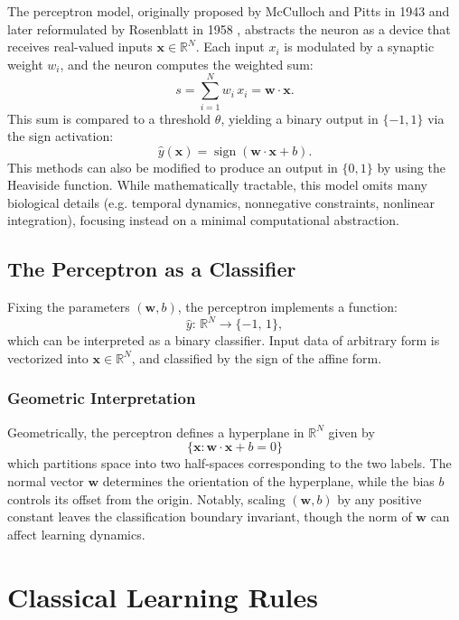 \documentclass[a4paper,12pt]{report}
\begin{document}
The perceptron model, originally proposed by McCulloch and Pitts in 1943 \cite{McCulloch1943} and later 
reformulated by Rosenblatt in 1958 \cite{Rosenblatt1958}, abstracts the neuron as a device that receives 
real-valued inputs $\mathbf{x}\in\mathbb R^N$. Each input $x_i$ is modulated by a synaptic weight 
$w_i$, and the neuron computes the weighted sum:
\[
  s = \sum_{i=1}^N w_i\,x_i = \mathbf{w}\cdot\mathbf{x}.
\]
This sum is compared to a threshold $\theta$, yielding a binary output in $\{-1,1\}$ via the sign activation:
\[
  \hat y(\mathbf{x}) = \operatorname{sign}(\mathbf{w}\cdot\mathbf{x} + b).
\]
This methods can also be modified to produce an output in $\{0, 1\}$ by using the Heaviside function.
While mathematically tractable, this model omits many biological details (e.g. temporal dynamics, 
nonnegative constraints, nonlinear integration), focusing instead on a minimal computational abstraction.

\subsection*{The Perceptron as a Classifier}
Fixing the parameters $(\mathbf{w},b)$, the perceptron implements a function:
\[
  \hat y:\,\mathbb R^N \to \{ -1,\,1 \},
\]
which can be interpreted as a binary classifier. Input data of arbitrary form is vectorized into 
$\mathbf{x}\in\mathbb R^N$, and classified by the sign of the affine form.

\subsubsection*{Geometric Interpretation}
Geometrically, the perceptron defines a hyperplane in $\mathbb R^N$ given by
\[
    \{\mathbf{x}: \mathbf{w}\cdot\mathbf{x} + b = 0\}
\]
which partitions space into two half-spaces corresponding to the two labels. The normal vector 
$\mathbf{w}$ determines the orientation of the hyperplane, while the bias $b$ controls its offset from 
the origin. Notably, scaling $(\mathbf{w},b)$ by any positive constant leaves the classification 
boundary invariant, though the norm of $\mathbf{w}$ can affect learning dynamics.


\section{Classical Learning Rules}\label{sec:learning_rules}
\end{document}
